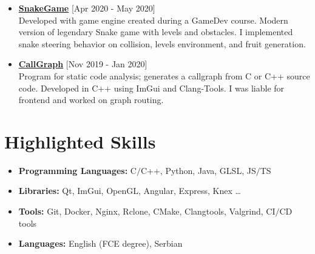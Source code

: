 \documentclass[a4paper]{moderncv}
\begin{document}
\begin{itemize}
			\item \textbf{\href{https://github.com/djordjetane/SnakeGame}{SnakeGame}} \hfill[Apr 2020 - May 2020]\\
			Developed with game engine created during a GameDev course. Modern version of legendary Snake game with levels 
			and obstacles. I implemented snake steering behavior on collision, levels environment, and fruit generation.

			\item \textbf{\href{https://github.com/djordjetane/CallGraph}{CallGraph}} \hfill[Nov 2019 - Jan 2020]\\
			Program for static code analysis; generates a callgraph from C or C++ source code. Developed in C++ using 
			ImGui and Clang-Tools. I was liable for frontend and worked on graph routing.

		\end{itemize}

\section{Highlighted Skills}

	\begin{itemize}
		
		\item \textbf{Programming Languages: } C$\slash$C++, Python, Java, GLSL, JS$\slash$TS
		\item \textbf{Libraries: } Qt, ImGui, OpenGL, Angular, Express, Knex \dots
		\item \textbf{Tools: } Git, Docker, Nginx, Rclone, CMake, Clangtools, Valgrind, CI$\slash$CD tools		
		\item \textbf{Languages: } English (FCE degree), Serbian
		
	\end{itemize}
%
%
\end{document}
